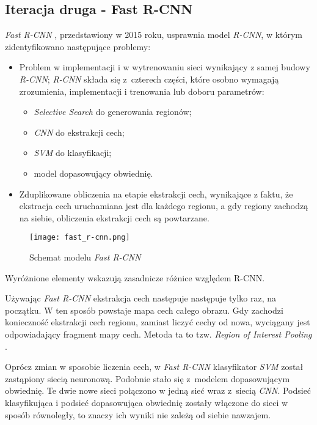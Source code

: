 \subsection{Iteracja druga - Fast R-CNN}

\textit{Fast R-CNN} \cite{fast-rcnn}, przedstawiony w 2015 roku, usprawnia model \textit{R-CNN}, w którym zidentyfikowano następujące problemy:

\begin{itemize}
  \item Problem w implementacji i w wytrenowaniu sieci wynikający z samej budowy \textit{R-CNN}; \textit{R-CNN} składa się z~czterech części, które osobno wymagają zrozumienia, implementacji i trenowania lub doboru parametrów:
		\begin{itemize}
			\item \textit{Selective Search} do generowania regionów;
			\item \textit{CNN} do ekstrakcji cech;
			\item \textit{SVM} do klasyfikacji;
			\item model dopasowujący obwiednię.
		\end{itemize}
  \item Zduplikowane obliczenia na etapie ekstrakcji cech, wynikające z faktu, że ekstracja cech uruchamiana jest dla każdego regionu, a gdy regiony zachodzą na siebie, obliczenia ekstrakcji cech są powtarzane.
\end{itemize}

\begin{figure}[h]
  \centering
  \caption{Schemat modelu \textit{Fast R-CNN}}
  \texttt{[image: fast\_r-cnn.png]}
  \label{fig:fast_r_cnn}
\end{figure}

Wyróżnione elementy wskazują zasadnicze różnice względem R-CNN.

Używając \textit{Fast R-CNN} ekstrakcja cech następuje następuje tylko raz, na początku.
W ten sposób powstaje mapa cech całego obrazu.
Gdy zachodzi konieczność ekstrakcji cech regionu, zamiast liczyć cechy od nowa, wyciągany jest odpowiadający fragment mapy cech.
Metoda ta to tzw. \textit{Region of Interest Pooling} \cite{fast-rcnn}.

Oprócz zmian w sposobie liczenia cech, w \textit{Fast R-CNN} klasyfikator \textit{SVM} został zastąpiony siecią neuronową.
Podobnie stało się z~modelem dopasowującym obwiednię.
Te dwie nowe sieci połączono w jedną sieć wraz z~siecią \textit{CNN}.
Podsieć klasyfikująca i podsieć dopasowująca obwiednię zostały włączone do sieci w sposób równoległy, to znaczy ich wyniki nie zależą od siebie nawzajem.

